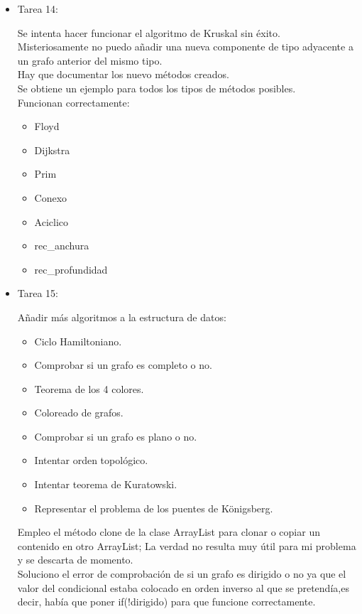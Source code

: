 \begin{itemize}
\item Tarea 14:

Se intenta hacer funcionar el algoritmo de Kruskal sin éxito. \\
Misteriosamente no puedo añadir una nueva componente de tipo adyacente a un grafo anterior del mismo tipo.\\
Hay que documentar los nuevo métodos creados.\\
Se obtiene un ejemplo para todos los tipos de métodos posibles. \\
Funcionan correctamente:
\begin{itemize}
\item Floyd
\item Dijkstra
\item Prim
\item Conexo
\item Aciclico
\item rec\_anchura
\item rec\_profundidad
\end{itemize}

\item Tarea 15:

Añadir más algoritmos a la estructura de datos:\\

\begin{itemize}
\item Ciclo Hamiltoniano.
\item Comprobar si un grafo es completo o no.
\item Teorema de los 4 colores.
\item Coloreado de grafos.
\item Comprobar si un grafo es plano o no.
\item Intentar orden topológico.
\item Intentar teorema de Kuratowski.
\item Representar el problema de los puentes de Königsberg.
\end{itemize}

Empleo el método clone de la clase ArrayList para clonar o copiar un contenido en otro ArrayList; La verdad no resulta muy útil para mi problema y se descarta de momento.\\

Soluciono el error de comprobación de si un grafo es dirigido o no ya que el valor del condicional estaba colocado en orden inverso al que se pretendía,es decir, había que poner if(!dirigido) para que funcione correctamente.\\


\end{itemize}
